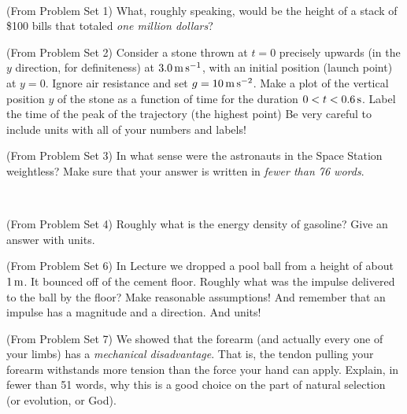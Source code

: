 \documentclass[12pt, letterpaper]{article}
\begin{document}
\vfill
~\clearpage

\begin{problem} (From Problem Set 1)
  What, roughly speaking, would be the height of a stack of \$100 bills that %
  totaled \emph{one million dollars}?
\end{problem}

\vfill

\begin{problem} (From Problem Set 2)
Consider a
stone thrown at $t=0$ precisely upwards (in the $y$ direction, for
definiteness) at $3.0\,\mathrm{m}\,\mathrm{s}^{-1}$, with an initial position (launch point)
at $y=0$.  Ignore air resistance and set $g=10\,\mathrm{m}\,\mathrm{s}^{-2}$.  Make a plot of the
vertical position $y$ of the stone as a function of time for the duration
$0<t<0.6\,\mathrm{s}$.  Label the time of
the peak of the trajectory (the highest point)
Be very careful to include units with all of your numbers and labels!
\end{problem}

\vfill

\begin{problem} (From Problem Set 3)
  In what sense were the astronauts in the Space Station weightless?
  Make sure that your answer is written in \emph{fewer than 76 words}.
\end{problem}

\vfill
~\clearpage

\begin{problem} (From Problem Set 4)
Roughly what is the energy density of gasoline? Give an answer with units.
\end{problem}

\vfill

\begin{problem} (From Problem Set 6)
In Lecture we dropped a pool ball from a height of about $1\,\mathrm{m}$. It
bounced off of the cement floor. Roughly what was the impulse
delivered to the ball by the floor? Make reasonable assumptions! And
remember that an impulse has a magnitude and a direction. And units!
\end{problem}

\vfill

\begin{problem} (From Problem Set 7)
  We showed that the forearm (and actually every one of your limbs) has a \emph{mechanical disadvantage}.
  That is, the tendon pulling your forearm withstands more tension than the force your hand can apply.
  Explain, in fewer than 51 words, why this is a good choice on the part of natural selection (or evolution, or God).
\end{problem}
\end{document}
